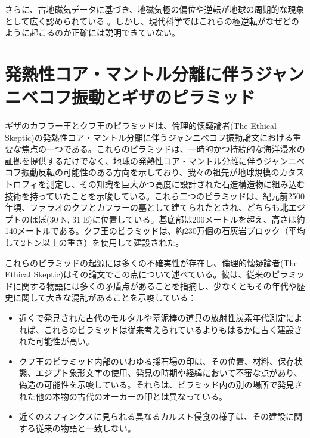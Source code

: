 \documentclass[10pt,twocolumn,letterpaper]{article}
\begin{document}
さらに、古地磁気データに基づき、地磁気極の偏位や逆転が地球の周期的な現象として広く認められている \cite{35,40,41}。しかし、現代科学ではこれらの極逆転がなぜどのように起こるのか正確には説明できていない。

\section{発熱性コア・マントル分離に伴うジャンニベコフ振動とギザのピラミッド}

ギザのカフラー王とクフ王のピラミッドは、倫理的懐疑論者(The Ethical Skeptic)の発熱性コア・マントル分離に伴うジャンニベコフ振動論文\cite{27}における重要な焦点の一つである。これらのピラミッドは、一時的かつ持続的な海洋浸水の証拠を提供するだけでなく、地球の発熱性コア・マントル分離に伴うジャンニベコフ振動反転の可能性のある方向を示しており、我々の祖先が地球規模のカタストロフィを測定し、その知識を巨大かつ高度に設計された石造構造物に組み込む技術を持っていたことを示唆している。これら二つのピラミッドは、紀元前2500年頃、ファラオのクフとカフラーの墓として建てられたとされ、どちらも北エジプトのほぼ(30 N, 31 E)に位置している。基底部は200メートルを超え、高さは約140メートルである。クフ王のピラミッドは、約230万個の石灰岩ブロック（平均して2トン以上の重さ）を使用して建設された\cite{24, 25}。

これらのピラミッドの起源には多くの不確実性が存在し、倫理的懐疑論者(The Ethical Skeptic)はその論文でこの点について述べている。彼は、従来のピラミッドに関する物語には多くの矛盾点があることを指摘し、少なくともその年代や歴史に関して大きな混乱があることを示唆している：

\begin{flushleft}
\begin{itemize}
    \item 近くで発見された古代のモルタルや墓泥棒の道具の放射性炭素年代測定によれば、これらのピラミッドは従来考えられているよりもはるかに古く建設された可能性が高い。
    \item クフ王のピラミッド内部のいわゆる採石場の印は、その位置、材料、保存状態、エジプト象形文字の使用、発見の時期や経緯において不審な点があり、偽造の可能性を示唆している。それらは、ピラミッド内の別の場所で発見された他の本物の古代のオーカーの印とは異なっている。
    \item 近くのスフィンクスに見られる異なるカルスト侵食の様子は、その建設に関する従来の物語と一致しない。
\end{itemize}
\end{flushleft}
\end{document}
